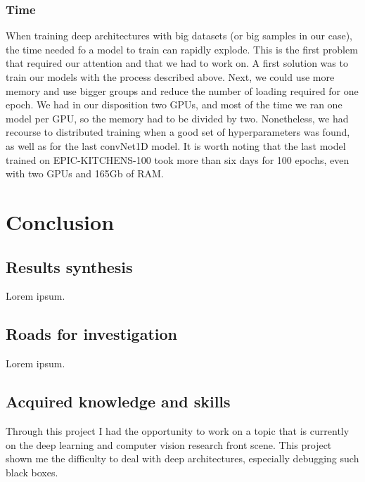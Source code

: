 \documentclass[12pt, a4paper]{report}
\begin{document}
			\subsection{Time}
				When training deep architectures with big datasets (or big samples in our case), the time needed fo a model to train can rapidly explode.
				This is the first problem that required our attention and that we had to work on.
				A first solution was to train our models with the process described above.
				Next, we could use more memory and use bigger groups and reduce the number of loading required for one epoch.
				We had in our disposition two GPUs, and most of the time we ran one model per GPU, so the memory had to be divided by two.
				Nonetheless, we had recourse to distributed training when a good set of hyperparameters was found, as well as for the last convNet1D model.
				It is worth noting that the last model trained on EPIC-KITCHENS-100 took more than six days for 100 epochs, even with two GPUs and 165Gb of RAM.
	\chapter{Conclusion}
		\section{Results synthesis}
			Lorem ipsum.
		\section{Roads for investigation}
			Lorem ipsum.
		\section{Acquired knowledge and skills}
			Through this project I had the opportunity to work on a topic that is currently on the deep learning and computer vision research front scene.
			This project shown me the difficulty to deal with deep architectures, especially debugging such black boxes.
	
	
	\appendix
\end{document}
